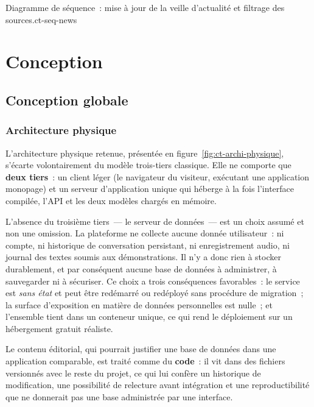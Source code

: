 {Diagramme de séquence~: mise à jour de la veille d'actualité et filtrage des
	sources.}{ct-seq-news}

\section{Conception}
\label{sec:ct-conception}

\subsection{Conception globale}

\subsubsection{Architecture physique}

L'architecture physique retenue, présentée en figure~\ref{fig:ct-archi-physique},
s'écarte volontairement du modèle trois-tiers classique. Elle ne comporte que
\textbf{deux tiers}~: un client léger (le navigateur du visiteur, exécutant une
application monopage) et un serveur d'application unique qui héberge à la fois
l'interface compilée, l'API et les deux modèles chargés en mémoire.

L'absence du troisième tiers~--- le serveur de données~--- est un choix assumé et non
une omission. La plateforme ne collecte aucune donnée utilisateur~: ni compte, ni
historique de conversation persistant, ni enregistrement audio, ni journal des textes
soumis aux démonstrations. Il n'y a donc rien à stocker durablement, et par
conséquent aucune base de données à administrer, à sauvegarder ni à sécuriser. Ce
choix a trois conséquences favorables~: le service est \textit{sans état} et peut être
redémarré ou redéployé sans procédure de migration~; la surface d'exposition en
matière de données personnelles est nulle~; et l'ensemble tient dans un conteneur
unique, ce qui rend le déploiement sur un hébergement gratuit réaliste.

Le contenu éditorial, qui pourrait justifier une base de données dans une application
comparable, est traité comme du \textbf{code}~: il vit dans des fichiers versionnés
avec le reste du projet, ce qui lui confère un historique de modification, une
possibilité de relecture avant intégration et une reproductibilité que ne donnerait
pas une base administrée par une interface.

